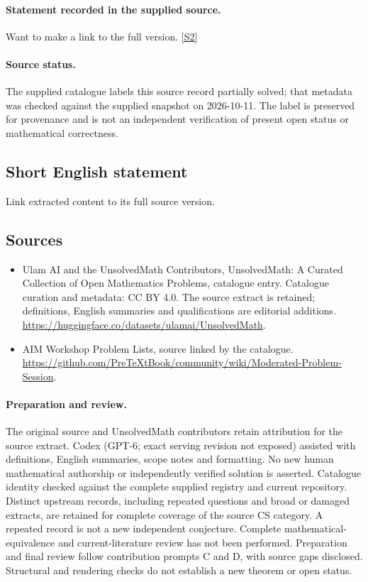 \documentclass[11pt]{article}
\begin{document}
\paragraph{Statement recorded in the supplied source.}
Want to make a link to the full version. \href{https://github.com/PreTeXtBook/community/wiki/Moderated-Problem-Session}{[S2]}
\paragraph{Source status.}
The supplied catalogue labels this source record partially solved; that metadata was checked against the supplied snapshot on 2026-10-11. The label is preserved for provenance and is not an independent verification of present open status or mathematical correctness.
\subsection{Short English statement}
Link extracted content to its full source version.
\subsection{Sources}
\begin{itemize}
\item[S1] Ulam AI and the UnsolvedMath Contributors, UnsolvedMath: A Curated Collection of Open Mathematics Problems, catalogue entry. Catalogue curation and metadata: CC BY 4.0. The source extract is retained; definitions, English summaries and qualifications are editorial additions.
\url{https://huggingface.co/datasets/ulamai/UnsolvedMath}.
\item[S2] AIM Workshop Problem Lists, source linked by the catalogue.
\url{https://github.com/PreTeXtBook/community/wiki/Moderated-Problem-Session}.
\end{itemize}
\paragraph{Preparation and review.}
The original source and UnsolvedMath contributors retain attribution for the source extract. Codex (GPT-6; exact serving revision not exposed) assisted with definitions, English summaries, scope notes and formatting. No new human mathematical authorship or independently verified solution is asserted. Catalogue identity checked against the complete supplied registry and current repository. Distinct upstream records, including repeated questions and broad or damaged extracts, are retained for complete coverage of the source CS category. A repeated record is not a new independent conjecture. Complete mathematical-equivalence and current-literature review has not been performed. Preparation and final review follow contribution prompts C and D, with source gaps disclosed. Structural and rendering checks do not establish a new theorem or open status.
\label{end:statement}
\end{document}
